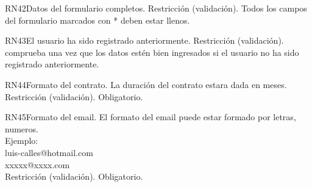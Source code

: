 \begin{BussinesRule}{RN42}{Datos del formulario completos.} 
	\BRitem[Tipo:] Restricción (validación).
	\BRitem[Descripción:]Todos los campos del formulario marcados con * deben estar llenos.
\end{BussinesRule}

\begin{BussinesRule}{RN43}{El usuario ha sido registrado anteriormente.} 
	\BRitem[Tipo:] Restricción (validación).
	\BRitem[Descripción:]comprueba una vez que los datos estén bien ingresados si el usuario no ha sido registrado anteriormente.
\end{BussinesRule}

\begin{BussinesRule}{RN44}{Formato del contrato.} 
	\BRitem[Descripción:] La duración del contrato estara dada en meses.
	\BRitem[Tipo:] Restricción (validación).
	\BRitem[Nivel:] Obligatorio.
\end{BussinesRule}

\begin{BussinesRule}{RN45}{Formato del email.} 
	\BRitem[Descripción:] El formato del email puede estar formado por letras, numeros.\\
	Ejemplo:\\
	luis-calles@hotmail.com\\
	xxxxx@xxxx.com\\

	\BRitem[Tipo:] Restricción (validación).
	\BRitem[Nivel:] Obligatorio.
\end{BussinesRule}










